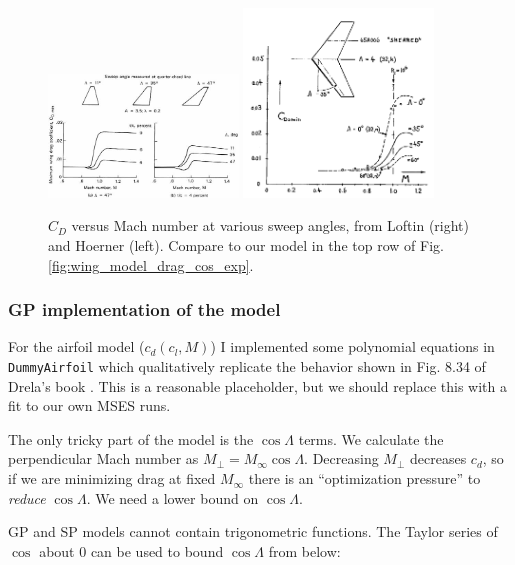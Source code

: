 \documentclass[12pt]{article}
\begin{document}
\begin{figure}[hbt!]
    \centering
    \includegraphics[width=0.45\textwidth]{figures/wing_drag_model/loftin_sweep}
    \includegraphics[width=0.45\textwidth]{figures/wing_drag_model/hoerner_fig_15_31}
    \caption{\label{fig:wing_drag_vs_sweep_refs} $C_D$ versus Mach number at various sweep angles, from Loftin \cite{Loftin1985} (right) and Hoerner \cite{Hoerner1965} (left). Compare to our model in the top row of Fig. \ref{fig:wing_model_drag_cos_exp}.}
\end{figure}


\subsubsection{GP implementation of the model}
For the airfoil model ($c_d(c_l, M)$) I implemented some polynomial equations in \texttt{DummyAirfoil} which qualitatively replicate the behavior shown in Fig. 8.34 of Drela's book \cite{Drela2014}. This is a reasonable placeholder, but we should replace this with a fit to our own MSES runs.

The only tricky part of the model is the $\cos\Lambda$ terms. We calculate the perpendicular Mach number as $M_\perp = M_\infty \cos\Lambda$. Decreasing $M_\perp$ decreases $c_d$, so if we are minimizing drag at fixed $M_\infty$ there is an ``optimization pressure'' to \emph{reduce} $\cos\Lambda$. We need a lower bound on $\cos\Lambda$.

GP and SP models cannot contain trigonometric functions. The Taylor series of $\cos$ about $0$ can be used to bound $\cos\Lambda$ from below:
\end{document}
